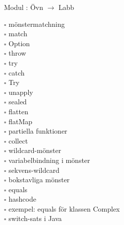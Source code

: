 
    Modul : Övn  $\rightarrow$ Labb 
    \begin{multicols}{3}\SlideFontTiny
    $\square$ mönstermatchning \\
$\square$ match \\
$\square$ Option \\
$\square$ throw \\
$\square$ try \\
$\square$ catch \\
$\square$ Try \\
$\square$ unapply \\
$\square$ sealed \\
$\square$ flatten \\
$\square$ flatMap \\
$\square$ partiella funktioner \\
$\square$ collect \\
$\square$ wildcard-mönster \\
$\square$ variabelbindning i mönster \\
$\square$ sekvens-wildcard \\
$\square$ bokstavliga mönster \\
$\square$ equals \\
$\square$ hashcode \\
$\square$ exempel: equals för klassen Complex \\
$\square$ switch-sats i Java \\
    \end{multicols}
    